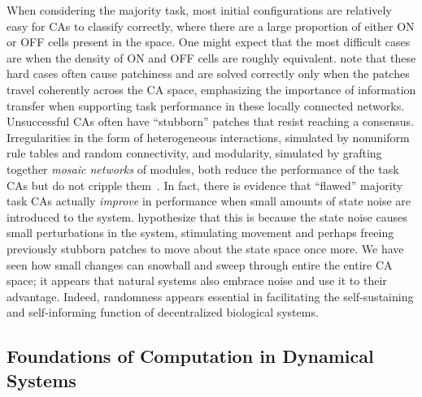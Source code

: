 \documentclass[a4paper,11pt]{article}
\begin{document}
When considering the majority task, most initial configurations are relatively easy for CAs to classify correctly, where there are a large proportion of either ON or OFF cells present in the space. One might expect that the most difficult cases are when the density of ON and OFF cells are roughly equivalent. \citeauthor{me07} note that these hard cases often cause patchiness and are solved correctly only when the patches travel coherently across the CA space, emphasizing the importance of information transfer when supporting task performance in these locally connected networks. Unsuccessful CAs often have ``stubborn'' patches that resist reaching a consensus. Irregularities in the form of heterogeneous interactions, simulated by nonuniform rule tables and random connectivity, and modularity, simulated by grafting together \textit{mosaic networks} of modules, both reduce the performance of the task CAs but do not cripple them~\cite{me07}. In fact, there is evidence that ``flawed'' majority task CAs actually \textit{improve} in performance when small amounts of state noise are introduced to the system. \citeauthor{me07} hypothesize that this is because the state noise causes small perturbations in the system, stimulating movement and perhaps freeing previously stubborn patches to move about the state space once more. We have seen how small changes can snowball and sweep through entire the entire CA space; it appears that natural systems also embrace noise and use it to their advantage. Indeed, randomness appears essential in facilitating the self-sustaining and self-informing function of decentralized biological systems.

\subsection{Foundations of Computation in Dynamical Systems}
\end{document}
